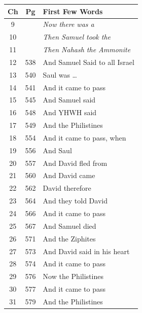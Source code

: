 \documentclass{article}
\newlength{\minipageheight}
\newlength{\minipagewidth}
\begin{document}
\begin{minipage}[r][\minipageheight][t]{\minipagewidth}%
    \begin{longtable}{ccl}
        \textbf{Ch} & \textbf{Pg}  & \textbf{First Few Words}               \\%
        \hline%
        \endfirsthead%
        9           &              & \textit{Now there was a}               \\
        10          &              & \textit{Then Samuel took the}          \\
        11          &              & \textit{Then Nahash the Ammonite}      \\
        12          & 538          & And Samuel Said to all Israel          \\
        13          & 540          & Saul was \dots                         \\
        14          & 541          & And it came to pass                    \\
        15          & 545          & And Samuel said                        \\
        16          & 548          & And YHWH said                          \\
        17          & 549          & And the Philistines                    \\
        18          & 554          & And it came to pass, when              \\
        19          & 556          & And Saul                               \\
        20          & 557          & And David fled from                    \\
        21          & 560          & And David came                         \\
        22          & 562          & David therefore                        \\
        23          & 564          & And they told David                    \\
        24          & 566          & And it came to pass                    \\
        25          & 567          & And Samuel died                        \\
        26          & 571          & And the Ziphites                       \\
        27          & 573          & And David said in his heart            \\
        28          & 574          & And it came to pass                    \\
        29          & 576          & Now the Philistines                    \\
        30          & 577          & And it came to pass                    \\
        31          & 579          & And the Philistines                    \\


\end{longtable}
\end{minipage}
\end{document}

